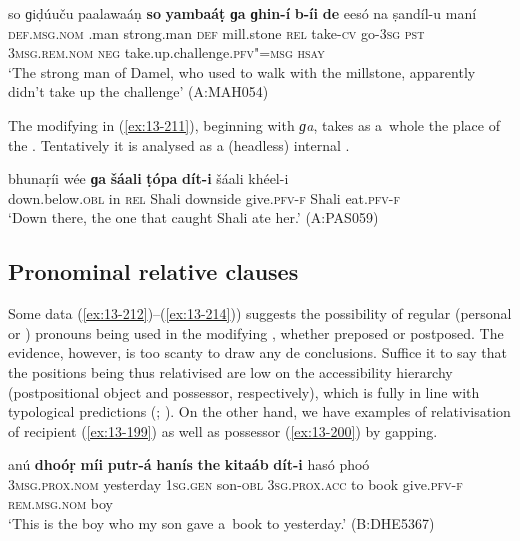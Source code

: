 \begin{exe}
\ex
\label{ex:13-210}
\gll so ɡiḍúuču paalawaáṇ \textbf{so} \textbf{yambaáṭ} \textbf{ɡa} \textbf{ɡhin-í} \textbf{b-íi} \textbf{de} eesó na ṣandíl-u maní\\
\textsc{def.msg.nom} \iliDameli.man strong.man \textsc{def} mill.stone \textsc{rel} take-\textsc{cv} go-\textsc{3sg} \textsc{pst} \textsc{3msg.rem.nom} \textsc{neg} take.up.challenge.\textsc{pfv"=msg} \textsc{hsay}\\
\glt `The strong man of Damel, who used to walk with the millstone, apparently didn't take up the challenge' (A:MAH054)
\end{exe}

The modifying  in (\ref{ex:13-211}), beginning with \textit{ɡa}, takes as a~whole the place of the  . Tentatively it is analysed as a (headless) internal .

\begin{exe}
\ex
\label{ex:13-211}
\gll bhunaṛíi wée \textbf{ɡa} \textbf{šáali} \textbf{ṭópa} \textbf{dít-i}  šáali khéel-i \\
down.below.\textsc{obl} in \textsc{rel} Shali downside give.\textsc{pfv-f} Shali eat.\textsc{pfv-f} \\
\glt `Down there, the one that caught Shali ate her.' (A:PAS059)
\end{exe}

\subsection{Pronominal relative clauses}
\label{subsec:13-6-5}


Some data (\ref{ex:13-212})--(\ref{ex:13-214})) suggests the possibility of regular  (personal or ) pronouns being used in the modifying , whether preposed or postposed. The evidence, however, is too scanty to draw any de conclusions. Suffice it to say that the positions being thus relativised are low on the accessibility hierarchy (postpositional object and possessor, respectively), which is fully in line with typological predictions (\citealt[147--148]{keenan1985}; \citealt[226]{andrews_relative2007}). On the other hand, we have examples of relativisation of recipient (\ref{ex:13-199}) as well as possessor (\ref{ex:13-200}) by gapping.

\ea
\label{ex:13-212}
\gll anú \textbf{dhoóṛ} \textbf{míi} \textbf{putr-á} \textbf{hanís} \textbf{the} \textbf{kitaáb} \textbf{dít-i} hasó phoó\\
\textsc{3msg.prox.nom} yesterday \textsc{1sg.gen} son-\textsc{obl} \textsc{3sg.prox.acc} to  book give.\textsc{pfv-f} \textsc{rem.msg.nom} boy \\
\glt `This is the boy who my son gave a~book to yesterday.' (B:DHE5367)


